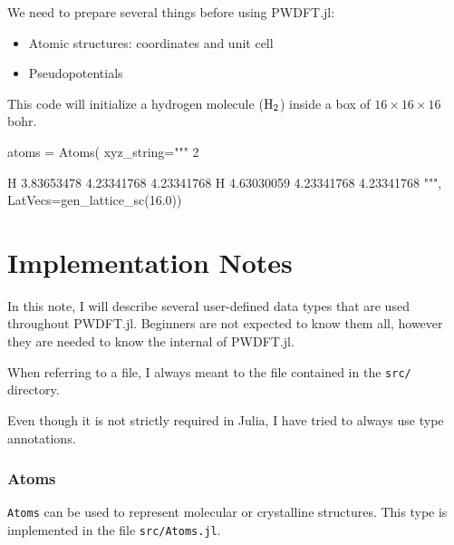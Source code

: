 \documentclass[a4paper,10pt,twocolumn]{paper}
\begin{document}
We need to prepare several things before using \textsf{PWDFT.jl}:
\begin{itemize}
\item Atomic structures: coordinates and unit cell
\item Pseudopotentials
\end{itemize}

This code will initialize a hydrogen molecule ($\ce{H2}$) inside a box of
$16\times16\times16$ bohr.
\begin{juliacode}
atoms = Atoms(
  xyz_string="""
  2
    
  H      3.83653478       4.23341768       4.23341768
  H      4.63030059       4.23341768       4.23341768
  """,
  LatVecs=gen_lattice_sc(16.0))
\end{juliacode}




\part{Implementation Notes}

In this note, I will describe several user-defined data types that are
used throughout \textsf{PWDFT.jl}. Beginners are not expected to know them
all, however they are needed to know the internal of \textsf{PWDFT.jl}.

When referring to a file, I always meant to the file contained in
the \texttt{src/} directory.

Even though it is not strictly required in Julia, I have tried to always
use type annotations.

\section{Atoms}

\texttt{Atoms} can be used to represent molecular or crystalline structures.
This type is implemented in the file \texttt{src/Atoms.jl}.
\end{document}
